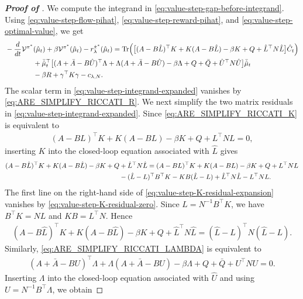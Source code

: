\documentclass[a4paper, 10pt, english, reqno]{amsart}
\begin{document}
\begin{proof}[\textbf{Proof of }]
We compute the integrand in \eqref{eq:value-step-gap-before-integrand}. Using \eqref{eq:value-step-flow-pihat}, \eqref{eq:value-step-reward-pihat}, and \eqref{eq:value-step-optimal-value}, we get
\begin{align}
\label{eq:value-step-integrand-expanded}
&-\frac{d}{dt}\mathcal V^{\pi^*}(\hat\mu_t)
+\beta\mathcal V^{\pi^*}(\hat\mu_t)
-r_\lambda^{\hat\pi^*}(\hat\mu_t)=
\operatorname{Tr}\Bigl(
\bigl[
(A-B\hat L)^\top K+K(A-B\hat L)-\beta K+Q+\hat L^\top N\hat L
\bigr]\hat C_t
\Bigr)
\notag\\
&\qquad\qquad
+
\bar{\hat\mu}_t^\top
\bigl[
(A+\bar A-B\hat U)^\top\Lambda+\Lambda(A+\bar A-B\hat U)-\beta\Lambda+Q+\bar Q+\hat U^\top N\hat U
\bigr]
\bar{\hat\mu}_t
\notag\\
&\qquad\qquad
-\beta R+\gamma^\top K\gamma-c_{\lambda,N}.
\end{align}
The scalar term in \eqref{eq:value-step-integrand-expanded} vanishes by \eqref{eq:ARE_SIMPLIFY_RICCATI_R}. We next simplify the two matrix residuals in \eqref{eq:value-step-integrand-expanded}. Since \eqref{eq:ARE_SIMPLIFY_RICCATI_K} is equivalent to
\begin{align}
\label{eq:value-step-K-residual-zero}
(A-BL)^\top K+K(A-BL)-\beta K+Q+L^\top NL=0,
\end{align}
inserting $K$ into the closed-loop equation associated with $\hat L$ gives
\begin{align}
\label{eq:value-step-K-residual-expansion}
(A-B\hat L)^\top K+K(A-B\hat L)-\beta K+Q&+\hat L^\top N\hat L=
(A-BL)^\top K+K(A-BL)-\beta K+Q+L^\top NL
\notag\\
&
-(\hat L-L)^\top B^\top K-KB(\hat L-L)+\hat L^\top N\hat L-L^\top NL .
\end{align}
The first line on the right-hand side of \eqref{eq:value-step-K-residual-expansion} vanishes by \eqref{eq:value-step-K-residual-zero}. Since $L=N^{-1}B^\top K$, we have $B^\top K=NL$ and $KB=L^\top N$. Hence
\begin{align}
\label{eq:value-step-K-residual-quadratic}
(A-B\hat L)^\top K+K(A-B\hat L)-\beta K+Q+\hat L^\top N\hat L
=
(\hat L-L)^\top N(\hat L-L).
\end{align}
Similarly, \eqref{eq:ARE_SIMPLIFY_RICCATI_LAMBDA} is equivalent to
\begin{align}
\label{eq:value-step-Lambda-residual-zero}
(A+\bar A-BU)^\top\Lambda+\Lambda(A+\bar A-BU)-\beta\Lambda+Q+\bar Q+U^\top NU=0.
\end{align}
Inserting $\Lambda$ into the closed-loop equation associated with $\hat U$ and using $U=N^{-1}B^\top\Lambda$, we obtain

\end{proof}
\end{document}
